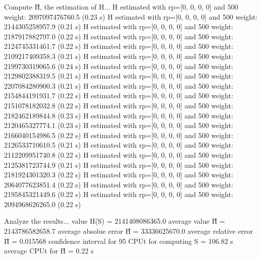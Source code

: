 Compute H̃, the estimation of H...
  H estimated with rp=[0, 0, 0, 0] and 500 weight:  2097097476760.5  (0.23 s)
  H estimated with rp=[0, 0, 0, 0] and 500 weight:  2144305258957.9  (0.21 s)
  H estimated with rp=[0, 0, 0, 0] and 500 weight:  2187917882797.0  (0.22 s)
  H estimated with rp=[0, 0, 0, 0] and 500 weight:  2124745331461.7  (0.22 s)
  H estimated with rp=[0, 0, 0, 0] and 500 weight:  2109217409358.3  (0.21 s)
  H estimated with rp=[0, 0, 0, 0] and 500 weight:  2199730319065.6  (0.24 s)
  H estimated with rp=[0, 0, 0, 0] and 500 weight:  2129802388319.5  (0.21 s)
  H estimated with rp=[0, 0, 0, 0] and 500 weight:  2207084280900.3  (0.21 s)
  H estimated with rp=[0, 0, 0, 0] and 500 weight:  2154844191931.7  (0.22 s)
  H estimated with rp=[0, 0, 0, 0] and 500 weight:  2151078182032.8  (0.22 s)
  H estimated with rp=[0, 0, 0, 0] and 500 weight:  2182462189844.8  (0.23 s)
  H estimated with rp=[0, 0, 0, 0] and 500 weight:  2120465327774.1  (0.23 s)
  H estimated with rp=[0, 0, 0, 0] and 500 weight:  2166040154986.5  (0.22 s)
  H estimated with rp=[0, 0, 0, 0] and 500 weight:  2126533710610.5  (0.21 s)
  H estimated with rp=[0, 0, 0, 0] and 500 weight:  2112209951740.8  (0.22 s)
  H estimated with rp=[0, 0, 0, 0] and 500 weight:  2125381723744.9  (0.21 s)
  H estimated with rp=[0, 0, 0, 0] and 500 weight:  2181924301320.3  (0.22 s)
  H estimated with rp=[0, 0, 0, 0] and 500 weight:  2064077623851.4  (0.22 s)
  H estimated with rp=[0, 0, 0, 0] and 500 weight:  2195845321449.6  (0.22 s)
  H estimated with rp=[0, 0, 0, 0] and 500 weight:  2094968626265.0  (0.22 s)

Analyze the results...
  value H(S)                  = 2141408086365.0 
  average value H̃             = 2143786582658.7 
  average absolue error H̃     = 33336625670.0 
  average relative error H̃    = 0.015568 
  confidence interval for 95%
  CPUt for computing S         = 106.82 s
  average CPUt for H̃           = 0.22 s

